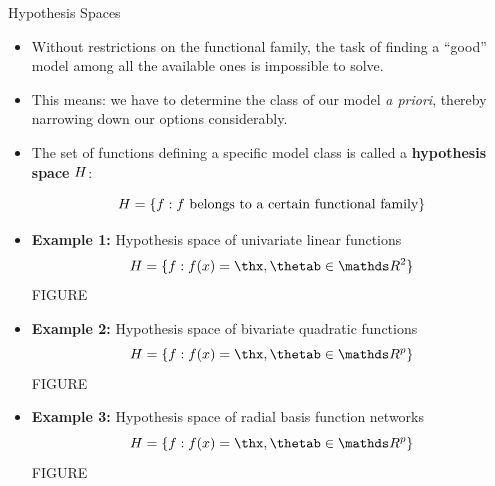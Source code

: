 \documentclass[11pt,compress,t,notes=noshow, xcolor=table]{beamer}
\begin{document}

\begin{vbframe}{Hypothesis Spaces}

\begin{itemize}

  \item Without restrictions on the functional family, the task of finding a 
  \enquote{good} model among all the available ones is impossible to solve.
  
  \item This means: we have to determine the class of our model \emph{a priori}, 
  thereby narrowing down our options considerably.
  
  \item The set of functions defining a specific model class is called a 
  \textbf{hypothesis space} $H$:
  
  $$H = \{f: f \text{ belongs to a certain functional family}\}$$
  
  \framebreak
  
  \item \textbf{Example 1:} Hypothesis space of univariate linear functions
  $$\Hspace = \{f: \fx =  \thx, \thetab \in \R^2\}$$
  \color{red} {FIGURE}
  \color{black}
  
  \item \textbf{Example 2:} Hypothesis space of bivariate quadratic functions
  $$\Hspace = \{f: \fx =  \thx, \thetab \in \R^p\}$$
  \color{red} {FIGURE}
  \color{black}
  
  \item \textbf{Example 3:} Hypothesis space of radial basis function networks
  $$\Hspace = \{f: \fx =  \thx, \thetab \in \R^p\}$$
  \color{red} {FIGURE}
  \color{black}

\end{itemize}  

\end{vbframe}

\end{document}
